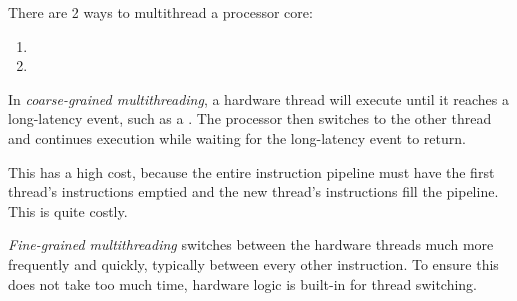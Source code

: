 There are 2 ways to multithread a processor core:
\begin{enumerate}[noitemsep]
\item {}
\item {}
\end{enumerate}

\begin{definition}\label{def:Coarse_Grained_Multithreading}
  In \emph{coarse-grained multithreading}, a hardware thread will execute until it reaches a long-latency event, such as a .
  The processor then switches to the other thread and continues execution while waiting for the long-latency event to return.

  This has a high cost, because the entire instruction pipeline must have the first thread's instructions emptied and the new thread's instructions fill the pipeline.
  This is quite costly.
\end{definition}

\begin{definition}\label{def:Fine_Grained_Multithreading}
  \emph{Fine-grained multithreading} switches between the hardware threads much more frequently and quickly, typically between every other instruction.
  To ensure this does not take too much time, hardware logic is built-in for thread switching.
\end{definition}

